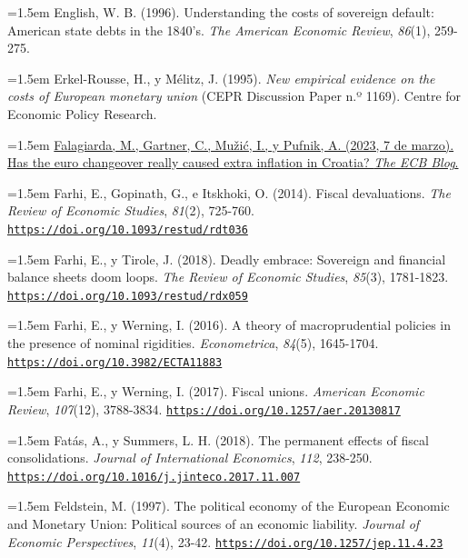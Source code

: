 \documentclass[10pt,a4paper]{article}
\begin{document}
\noindent\hangindent=1.5em English, W. B. (1996). Understanding the costs of sovereign default: American state debts in the 1840's. \textit{The American Economic Review}, \textit{86}(1), 259-275.

\noindent\hangindent=1.5em Erkel-Rousse, H., y Mélitz, J. (1995). \textit{New empirical evidence on the costs of European monetary union} (CEPR Discussion Paper n.º 1169). Centre for Economic Policy Research.

\noindent\hangindent=1.5em \href{https://www.ecb.europa.eu/press/blog/date/2023/html/ecb.blog.230307~1669dec988.en.html}{Falagiarda, M., Gartner, C., Mužić, I., y Pufnik, A. (2023, 7 de marzo). Has the euro changeover really caused extra inflation in Croatia? \textit{The ECB Blog}.}

\noindent\hangindent=1.5em Farhi, E., Gopinath, G., e Itskhoki, O. (2014). Fiscal devaluations. \textit{The Review of Economic Studies}, \textit{81}(2), 725-760. \href{https://doi.org/10.1093/restud/rdt036}{\nolinkurl{https://doi.org/10.1093/restud/rdt036}}

\noindent\hangindent=1.5em Farhi, E., y Tirole, J. (2018). Deadly embrace: Sovereign and financial balance sheets doom loops. \textit{The Review of Economic Studies}, \textit{85}(3), 1781-1823. \href{https://doi.org/10.1093/restud/rdx059}{\nolinkurl{https://doi.org/10.1093/restud/rdx059}}

\noindent\hangindent=1.5em Farhi, E., y Werning, I. (2016). A theory of macroprudential policies in the presence of nominal rigidities. \textit{Econometrica}, \textit{84}(5), 1645-1704. \href{https://doi.org/10.3982/ECTA11883}{\nolinkurl{https://doi.org/10.3982/ECTA11883}}

\noindent\hangindent=1.5em Farhi, E., y Werning, I. (2017). Fiscal unions. \textit{American Economic Review}, \textit{107}(12), 3788-3834. \href{https://doi.org/10.1257/aer.20130817}{\nolinkurl{https://doi.org/10.1257/aer.20130817}}

\noindent\hangindent=1.5em Fatás, A., y Summers, L. H. (2018). The permanent effects of fiscal consolidations. \textit{Journal of International Economics}, \textit{112}, 238-250. \href{https://doi.org/10.1016/j.jinteco.2017.11.007}{\nolinkurl{https://doi.org/10.1016/j.jinteco.2017.11.007}}

\noindent\hangindent=1.5em Feldstein, M. (1997). The political economy of the European Economic and Monetary Union: Political sources of an economic liability. \textit{Journal of Economic Perspectives}, \textit{11}(4), 23-42. \href{https://doi.org/10.1257/jep.11.4.23}{\nolinkurl{https://doi.org/10.1257/jep.11.4.23}}
\end{document}
